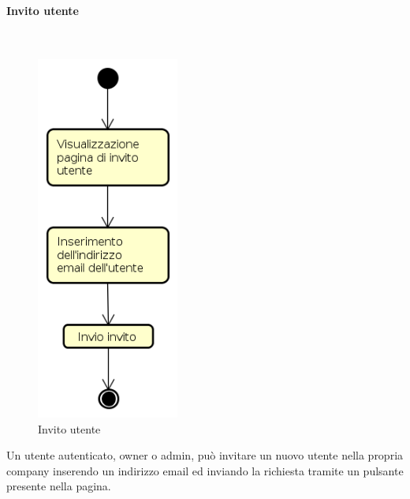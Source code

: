 \paragraph{Invito utente} \mbox{} \\
\begin{figure}[H]
\begin{center}
\includegraphics[height=12cm]{res/sections/backend/activities/invitoUtente.png}
\caption{Invito utente}
\end{center}
\end{figure}
Un utente autenticato, owner o admin, può invitare un nuovo utente nella propria company inserendo un indirizzo email ed inviando la richiesta tramite un pulsante presente nella pagina.
